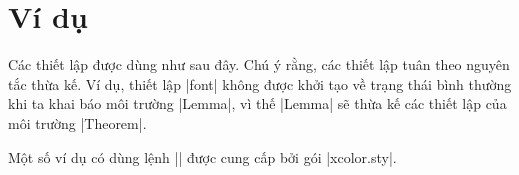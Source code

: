 \section{\texorpdfstring{Ví dụ}{Vi du}}

\label{sec:examples}

Các thiết lập được dùng như sau đây.
Chú ý rằng, các thiết lập tuân theo nguyên tắc thừa kế. Ví dụ,
thiết lập |font| không được khởi tạo về trạng thái bình thường khi ta
khai báo môi trường |Lemma|, vì thế |Lemma| sẽ thừa kế các thiết lập
của môi trường |Theorem|.

\medskip
Một số ví dụ có dùng lệnh |\color| được cung cấp bởi gói |xcolor.sty|.

